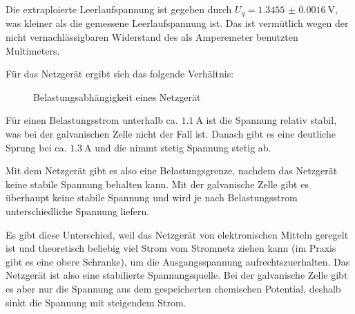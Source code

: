 Die extraploierte Leerlaufspannung ist gegeben durch $U_q = \SI{1.3455(16)}{\volt}$, was kleiner als die gemessene Leerlaufspannung ist. Das ist vermütlich wegen der nicht vernachlässigbaren Widerstand des als Amperemeter benutzten Multimeters.

Für das Netzgerät ergibt sich das folgende Verhältnis:
\begin{figure}[H]
	\centering
	
	\caption{\centering Belastungsabhängigkeit eines Netzgerät}
	\label{fig:tvone-ng-plot}
	\vspace{-1em}
\end{figure}
Für einen Belastungsstrom unterhalb ca. $\SI{1.1}{\ampere}$ ist die Spannung relativ stabil, was bei der galvanischen Zelle nicht der Fall ist. Danach gibt es eine deutliche Sprung bei ca. $\SI{1.3}{\ampere}$ und die nimmt stetig Spannung stetig ab. 

Mit dem Netzgerät gibt es also eine Belastungsgrenze, nachdem das Netzgerät keine stabile Spannung behalten kann. Mit der galvanische Zelle gibt es überhaupt keine stabile Spannung und wird je nach Belastungsstrom unterschiedliche Spannung liefern. 

Es gibt diese Unterschied, weil das Netzgerät von elektronischen Mitteln geregelt ist und theoretisch beliebig viel Strom vom Stromnetz ziehen kann (im Praxis gibt es eine obere Schranke), um die Ausgangsspannung aufrechtszuerhalten. Das Netzgerät ist also eine stabilierte Spannungsquelle. Bei der galvanische Zelle gibt es aber nur die Spannung aus dem gespeicherten chemischen Potential, deshalb sinkt die Spannung mit steigendem Strom. 